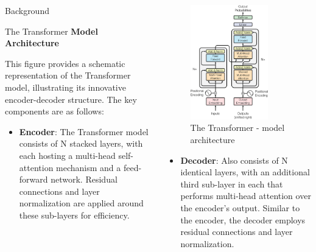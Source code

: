 \documentclass[final,t]{beamer}
\begin{document}
\begin{frame}[fragile]{}
\begin{columns}[t]
\begin{column}{.3\linewidth}
\begin{block}{Background}
    \end{block}
	\begin{block}{The Transformer}
	\textbf{Model Architecture}

	This figure provides a schematic representation of the Transformer model, illustrating its innovative encoder-decoder structure. The key components are as follows:
	\begin{itemize}
		\item \textbf{Encoder}: The Transformer model consists of N stacked layers, with each hosting a multi-head self-attention mechanism and a feed-forward network. Residual connections and layer normalization are applied around these sub-layers for efficiency.
	\end{itemize}
	\end{block}
    \end{column}

    \begin{column}{.3\linewidth}
      \begin{ntblock}
		\begin{figure}
			\includegraphics[width=0.8\textwidth]{figures/ModalNet-21.png}
			\caption{The Transformer - model architecture}
		\end{figure}
		\begin{itemize}
			\item \textbf{Decoder}: Also consists of N identical layers, with an additional third sub-layer in each that performs multi-head attention over the encoder's output. Similar to the encoder, the decoder employs residual connections and layer normalization.
		\end{itemize}


\end{ntblock}
\end{column}
\end{columns}
\end{frame}
\end{document}

